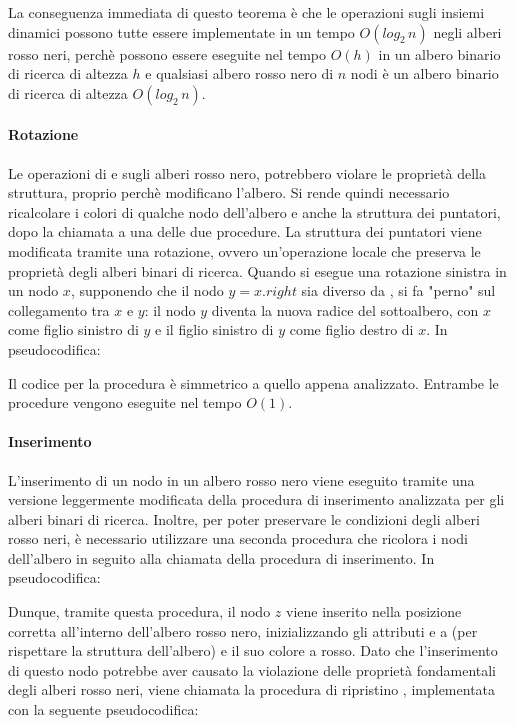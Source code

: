 \noindent La conseguenza immediata di questo teorema è che le operazioni sugli insiemi dinamici possono tutte essere implementate in un tempo \(O(log_2\,n)\) negli alberi rosso neri, perchè possono essere eseguite nel tempo  \(O(h)\) in un albero binario di ricerca di altezza \(h\) e qualsiasi albero rosso nero di \(n\) nodi è un albero binario di ricerca di altezza \(O(log_2\,n)\).

\paragraph{Rotazione}
Le operazioni di  e  sugli alberi rosso nero, potrebbero violare le proprietà della struttura, proprio perchè modificano l'albero. Si rende quindi necessario ricalcolare i colori di qualche nodo dell'albero e anche la struttura dei puntatori, dopo la chiamata a una delle due procedure. La struttura dei puntatori viene modificata tramite una rotazione, ovvero un'operazione locale che preserva le proprietà degli alberi binari di ricerca. Quando si esegue una rotazione sinistra in un nodo \(x\), supponendo che il nodo \(y = x.right\) sia diverso da , si fa "perno" sul collegamento tra \(x\) e \(y\): il nodo \(y\) diventa la nuova radice del sottoalbero, con \(x\) come figlio sinistro di \(y\) e il figlio sinistro di \(y\) come figlio destro di \(x\). In pseudocodifica:



Il codice per la procedura  è simmetrico a quello appena analizzato. Entrambe le procedure vengono eseguite nel tempo \(O(1)\).

\paragraph{Inserimento}
L'inserimento di un nodo in un albero rosso nero viene eseguito tramite una versione leggermente modificata della procedura di inserimento analizzata per gli alberi binari di ricerca. Inoltre, per poter preservare le condizioni degli alberi rosso neri, è necessario utilizzare una seconda procedura che ricolora i nodi dell'albero in seguito alla chiamata della procedura di inserimento. In pseudocodifica:



Dunque, tramite questa procedura, il nodo \(z\) viene inserito nella posizione corretta all'interno dell'albero rosso nero, inizializzando gli attributi  e  a  (per rispettare la struttura dell'albero) e il suo colore a rosso. Dato che l'inserimento di questo nodo potrebbe aver causato la violazione delle proprietà fondamentali degli alberi rosso neri, viene chiamata la procedura di ripristino , implementata con la seguente pseudocodifica:

